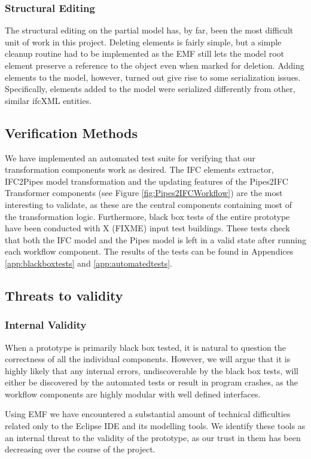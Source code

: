\subsubsection{Structural Editing} The structural editing on the partial model has, by far, been the most difficult unit of work in this project. Deleting elements is fairly simple, but a simple cleanup routine had to be implemented as the EMF still lets the model root element preserve a reference to the object even when marked for deletion. Adding elements to the model, however, turned out give rise to some serialization issues. Specifically, elements added to the model were serialized differently from other, similar ifcXML entities.

\subsection{Verification Methods}
\label{subsec:verification_methods}
We have implemented an automated test suite for verifying that our transformation components work as desired. The IFC elements extractor, IFC2Pipes model transformation and the updating features of the Pipes2IFC Transformer components (see Figure \ref{fig:Pipes2IFCWorkflow}) are the most interesting to validate, as these are the central components containing most of the transformation logic. Furthermore, black box tests of the entire prototype have been conducted with X (FIXME) input test buildings. These tests check that both the IFC model and the Pipes model is left in a valid state after running each workflow component. The results of the tests can be found in Appendices \ref{app:blackboxtests} and \ref{app:automatedtests}.

\subsection{Threats to validity}
\subsubsection{Internal Validity} When a prototype is primarily black box tested, it is natural to question the correctness of all the individual components. However, we will argue that it is highly likely that any internal errors, undiscoverable by the black box tests, will either be discovered by the automated tests or result in program crashes, as the workflow components are highly modular with well defined interfaces.

Using EMF we have encountered a substantial amount of technical difficulties related only to the Eclipse IDE and its modelling tools. We identify these tools as an internal threat to the validity of the prototype, as our trust in them has been decreasing over the course of the project.

